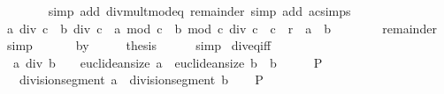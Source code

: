 \begin{isabellebody}
\ \ \ \ \ \ \isamarkupfalse%
\ {\isacharparenleft}{\kern0pt}simp\ add{\isacharcolon}{\kern0pt}\ div{\isacharunderscore}{\kern0pt}mult{\isacharunderscore}{\kern0pt}mod{\isacharunderscore}{\kern0pt}eq\ remainder{\isacharparenright}{\kern0pt}\ {\isacharparenleft}{\kern0pt}simp\ add{\isacharcolon}{\kern0pt}\ ac{\isacharunderscore}{\kern0pt}simps{\isacharparenright}{\kern0pt}\isanewline
\ \ \ \ \isamarkupfalse%
\ \isamarkupfalse%
\ {\isachardoublequoteopen}{\isacharparenleft}{\kern0pt}a\ div\ c\ {\isacharplus}{\kern0pt}\ b\ div\ c\ {\isacharplus}{\kern0pt}\ {\isacharparenleft}{\kern0pt}a\ mod\ c\ {\isacharplus}{\kern0pt}\ b\ mod\ c{\isacharparenright}{\kern0pt}\ div\ c{\isacharparenright}{\kern0pt}\ {\isacharasterisk}{\kern0pt}\ c\ {\isacharplus}{\kern0pt}\ r\ {\isacharequal}{\kern0pt}\ a\ {\isacharplus}{\kern0pt}\ b{\isachardoublequoteclose}\isanewline
\ \ \ \ \ \ \isamarkupfalse%
\ remainder\ \isamarkupfalse%
\ simp\isanewline
\ \ \isamarkupfalse%
\isanewline
{}\isamarkupfalse%
\isanewline
\ \ \isamarkupfalse%
\ by{}\isanewline
\ \ \isamarkupfalse%
\ \isamarkupfalse%
\ {\isacharquery}{\kern0pt}thesis\isanewline
\ \ \ \ \isamarkupfalse%
\ simp\isanewline
{}\isamarkupfalse%
%
\endisatagproof
{\isafoldproof}%
%
\isadelimproof
\isanewline
%
\endisadelimproof
\isanewline
{}\isamarkupfalse%
\ div{\isacharunderscore}{\kern0pt}eq{\isacharunderscore}{\kern0pt}{}{\isacharunderscore}{\kern0pt}iff{\isacharcolon}{\kern0pt}\isanewline
\ \ {\isachardoublequoteopen}a\ div\ b\ {\isacharequal}{\kern0pt}\ {}\ {\isasymlongleftrightarrow}\ euclidean{\isacharunderscore}{\kern0pt}size\ a\ {\isacharless}{\kern0pt}\ euclidean{\isacharunderscore}{\kern0pt}size\ b\ {\isasymor}\ b\ {\isacharequal}{\kern0pt}\ {}{\isachardoublequoteclose}\ {\isacharparenleft}{\kern0pt}\ {\isachardoublequoteopen}{\isacharunderscore}{\kern0pt}\ {\isasymlongleftrightarrow}\ {\isacharquery}{\kern0pt}P{\isachardoublequoteclose}{\isacharparenright}{\kern0pt}\isanewline
\ \ \ {\isachardoublequoteopen}division{\isacharunderscore}{\kern0pt}segment\ a\ {\isacharequal}{\kern0pt}\ division{\isacharunderscore}{\kern0pt}segment\ b{\isachardoublequoteclose}\isanewline
%
\isadelimproof
%
\endisadelimproof
%
\isatagproof
{}\isamarkupfalse%
\isanewline
\ \ \isamarkupfalse%
\ {\isacharquery}{\kern0pt}P\isanewline

\end{isabellebody}
